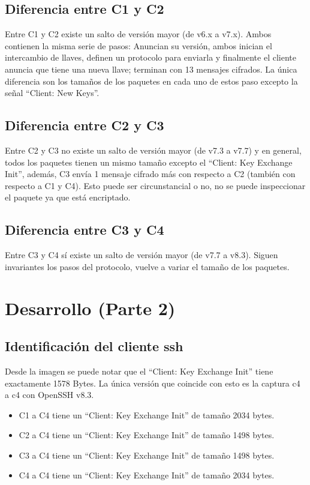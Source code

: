 \documentclass[letter,12pt]{article}
\begin{document}
\subsection{Diferencia entre C1 y C2}
Entre C1 y C2 existe un salto de versión mayor (de v6.x a v7.x). Ambos contienen la misma serie de pasos: Anuncian su versión, ambos inician el intercambio de llaves, definen un protocolo para enviarla y finalmente el cliente anuncia que tiene una nueva llave; terminan con 13 mensajes cifrados. La única diferencia son los tamaños de los paquetes en cada uno de estos paso excepto la señal ``Client: New Keys''.

\subsection{Diferencia entre C2 y C3}
Entre C2 y C3 no existe un salto de versión mayor (de v7.3 a v7.7) y en general, todos los paquetes tienen un mismo tamaño excepto el ``Client: Key Exchange Init'', además, C3 envía 1 mensaje cifrado más con respecto a C2 (también con respecto a C1 y C4). Esto puede ser circunstancial o no, no se puede inspeccionar el paquete ya que está encriptado.

\subsection{Diferencia entre C3 y C4}
Entre C3 y C4 sí existe un salto de versión mayor (de v7.7 a v8.3). Siguen invariantes los pasos del protocolo, vuelve a variar el tamaño de los paquetes.

\section{Desarrollo (Parte 2)}
\subsection{Identificación del cliente ssh}
Desde la imagen se puede notar que el ``Client: Key Exchange Init'' tiene exactamente 1578 Bytes. La única versión que coincide con esto es la captura c4 a c4 con OpenSSH v8.3.

\begin{itemize}
        \item C1 a C4 tiene un ``Client: Key Exchange Init'' de tamaño 2034 bytes.
        \item C2 a C4 tiene un ``Client: Key Exchange Init'' de tamaño 1498 bytes.
        \item C3 a C4 tiene un ``Client: Key Exchange Init'' de tamaño 1498 bytes.
        \item C4 a C4 tiene un ``Client: Key Exchange Init'' de tamaño 2034 bytes.
\end{itemize}
\end{document}

